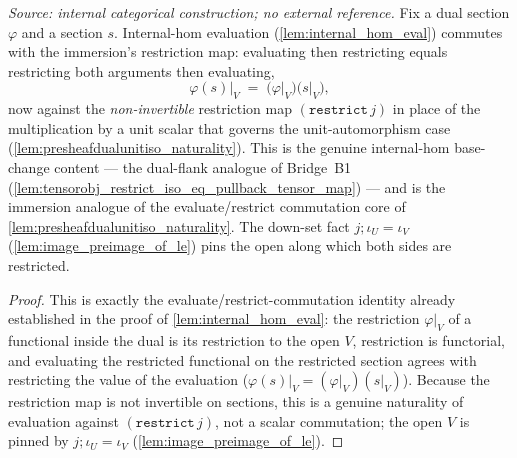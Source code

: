 \begin{lemma}
  \label{lem:presheafdual_eval_restrict_commute_apply}
  \textit{Source: internal categorical construction; no external reference.}
  Fix a dual section \(\varphi\) and a section \(s\). Internal-hom evaluation
  (\cref{lem:internal_hom_eval}) commutes with the immersion's restriction map: evaluating then
  restricting equals restricting both arguments then evaluating,
  \[
    \varphi(s)\big|_V \;=\; \bigl(\varphi\big|_V\bigr)\bigl(s\big|_V\bigr),
  \]
  now against the \emph{non-invertible} restriction map \((\mathtt{restrict}\,j)\) in place of the
  multiplication by a unit scalar that governs the unit-automorphism case
  (\cref{lem:presheafdualunitiso_naturality}). This is the genuine internal-hom base-change content ---
  the dual-flank analogue of Bridge~B1 (\cref{lem:tensorobj_restrict_iso_eq_pullback_tensor_map}) ---
  and is the immersion analogue of the evaluate/restrict commutation core of
  \cref{lem:presheafdualunitiso_naturality}. The
  down-set fact \(j \mathbin{;} \iota_U = \iota_V\) (\cref{lem:image_preimage_of_le}) pins the open
  along which both sides are restricted.
\end{lemma}
\begin{proof}
  This is exactly the evaluate/restrict-commutation identity already established in the proof of
  \cref{lem:internal_hom_eval}: the restriction \(\varphi|_V\) of a functional inside the dual is its
  restriction to the open \(V\), restriction is functorial, and evaluating the restricted functional
  on the restricted section agrees with restricting the value of the evaluation
  (\(\varphi(s)|_V = (\varphi|_V)(s|_V)\)). Because the restriction map is not invertible on sections,
  this is a genuine naturality of evaluation against \((\mathtt{restrict}\,j)\), not a scalar
  commutation; the open \(V\) is pinned by \(j \mathbin{;} \iota_U = \iota_V\)
  (\cref{lem:image_preimage_of_le}).
\end{proof}

